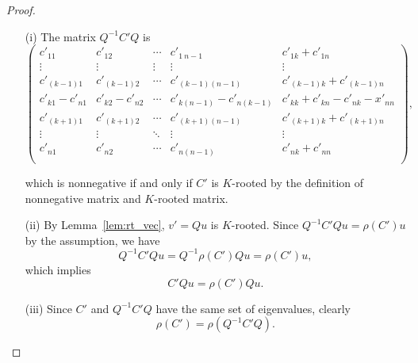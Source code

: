 \documentclass[12pt, a4paper]{article}
\theoremstyle{plain}
\theoremstyle{definition}
\newtheorem{rem}[thm]{Remark}
\begin{document}

\begin{proof}
\begin{enumerate}
  \item[(i)] The matrix $Q^{-1}C'Q$ is
        $$\begin{pmatrix}
            c'_{11}     & c'_{12} & \cdots     & c'_{1\ n-1} & c'_{1k}+c'_{1n} \\
            \vdots      & \vdots  & \vdots     & \vdots      & \vdots\\
            c'_{(k-1) 1}   & c'_{(k-1)  2}           & \cdots     & c'_{(k-1) (n-1)} & c'_{(k-1) k}+c'_{(k-1) n} \\
            c'_{k1}-c'_{n1} & c'_{k2}-c'_{n2} &\cdots      &c'_{k (n-1)}-c'_{n (k-1)}& c'_{kk}+c'_{kn}-c'_{nk}-x'_{nn}\\
            c'_{(k+1) 1}   & c'_{(k+1) 2}           & \cdots     & c'_{(k+1) (n-1)} & c'_{(k+1) k}+c'_{(k+1)
             n} \\
            \vdots              & \vdots & \ddots              & \vdots & \vdots \\
            c'_{n1}     & c'_{n2} & \cdots             & c'_{n (n-1)} & c'_{nk}+c'_{nn} \\
        \end{pmatrix},$$








        which is nonnegative if and only if $C'$ is $K$-rooted by the definition of nonnegative matrix and $K$-rooted matrix.
  \item[(ii)] By Lemma~\ref{lem:rt_vec}, $v'=Qu$ is $K$-rooted. Since $Q^{-1}C'Qu=\rho(C')u$ by the assumption, we have
      $$Q^{-1} C' Q u  = Q^{-1} \rho(C') Qu  =\rho(C')u,$$
      which implies
        $$C'Qu=\rho(C')Qu.$$
  \item[(iii)] Since $C'$ and $Q^{-1}C'Q$ have the same set of eigenvalues, clearly
  $$\rho(C') = \rho(Q^{-1}C'Q).$$
\end{enumerate}
\end{proof}
\end{document}
